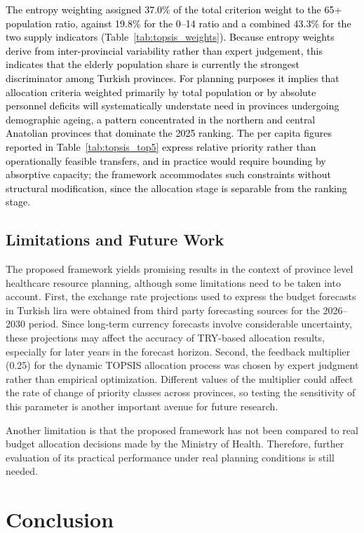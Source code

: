 \documentclass[final, 9pt, twocolumn]{saucis}
\newcommand{\rev}[1]{\textcolor{black}{#1}}
\begin{document}
\rev{The entropy weighting assigned 37.0\% of the total criterion weight to the
65+ population ratio, against 19.8\% for the 0--14 ratio and a combined 43.3\%
for the two supply indicators (Table~\ref{tab:topsis_weights}). Because entropy
weights derive from inter-provincial variability rather than expert judgement,
this indicates that the elderly population share is currently the strongest
discriminator among Turkish provinces. For planning purposes it implies that
allocation criteria weighted primarily by total population or by absolute
personnel deficits will systematically understate need in provinces undergoing
demographic ageing, a pattern concentrated in the northern and central Anatolian
provinces that dominate the 2025 ranking. The per capita figures reported in
Table~\ref{tab:topsis_top5}  express relative
priority rather than operationally feasible transfers, and in practice would
require bounding by absorptive capacity; the framework accommodates such
constraints without structural modification, since the allocation stage is
separable from the ranking stage.}

\subsection{Limitations and Future Work}
The proposed framework yields promising results in the context of province level healthcare resource planning, although some limitations need to be taken into account. First, the exchange rate projections used to express the budget forecasts in Turkish lira were obtained from third party forecasting sources for the 2026--2030 period. Since long-term currency forecasts involve considerable uncertainty, these projections may affect the accuracy of TRY-based allocation results, especially for later years in the forecast horizon. Second, the feedback multiplier (0.25) for the dynamic TOPSIS allocation process was chosen by expert judgment rather than empirical optimization. Different values of the multiplier could affect the rate of change of priority classes across provinces, so testing the sensitivity of this parameter is another important avenue for future research.

Another limitation is that the proposed framework has not been compared to real budget allocation decisions made by the Ministry of Health. Therefore, further evaluation of its practical performance under real planning conditions is still needed.

\section{Conclusion}
\end{document}
